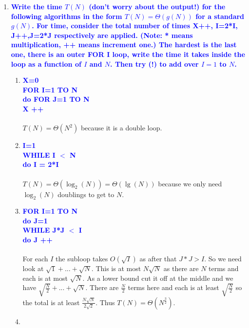 \documentclass{article}
\begin{document}
\begin{enumerate}
\item \textbf{\textcolor{blue}{Write the time $T(N)$ (don't worry about the output!) for the following algorithms in the form $T(N)=\Theta(g(N))$ for a standard $g(N)$. For time, consider the
total number of times X++, I=2*I, J++,J=2*J respectively are applied. (Note: * means multiplication, ++ means increment one.)  The hardest is the last one, there is an outer FOR I loop, write the time it takes inside the loop as a function of $I$ and $N$. Then try (!) to add over $I=1$ to $N$.}}
    \begin{enumerate}
    \item \textbf{\textcolor{blue}{
    X=0
    \\ FOR I=1 TO N
    \\ \hspace*{1cm} do FOR J=1 TO N
    \\ \hspace*{2cm} X ++ }}
        \\\\ $T(N)=\Theta(N^2)$ because it is a double loop.
    \item \textbf{\textcolor{blue}{
    I=1
    \\ WHILE I $<$ N
    \\ \hspace*{1cm} do I = 2*I}}
        \\\\ $T(N)=\Theta(\log_2(N)) = \Theta(\lg(N))$ because we 
		only need $\log_2(N)$ doublings to get to $N$.
    \item \textbf{\textcolor{blue}{
    FOR I=1 TO N
    \\ \hspace*{1cm} do J=1
    \\ \hspace*{1cm} WHILE J*J $<$ I
    \\ \hspace*{2cm} do J ++}}
        \\\\ For each $I$ the subloop takes $O(\sqrt{I})$ as after that $J*J>I$.
		So we need look at $\sqrt{1}+...+\sqrt{N}$. 
		This is at most $N\sqrt{N}$ as there are $N$ terms and each is 
		at most $\sqrt{N}$.  As a lower bound cut it off at the middle and 
		we have $\sqrt{\frac{N}{2}} + ... + \sqrt{N}$. There are $\frac{N}{2}$ terms 
		here and each is at least $\sqrt{\frac{N}{2}}$ so the total is at 
		least $\frac{N\sqrt{N}}{2\sqrt{2}}$. Thus $T(N)=\Theta(N^{\frac{3}{2}})$.
    \item \textbf{\textcolor{blue}{
}}
\end{enumerate}
\end{enumerate}
\end{document}
